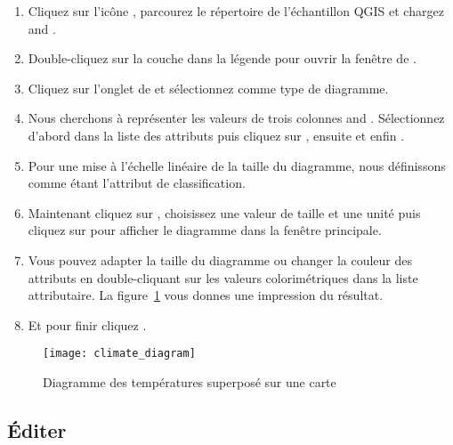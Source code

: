 \begin{itemize}
\begin{enumerate}
\item Cliquez sur l'icône , parcourez le répertoire de l'échantillon QGIS et chargez  and .
\item Double-cliquez sur la couche  dans la légende pour ouvrir la fenêtre de .
\item Cliquez sur l'onglet de  et sélectionnez  comme type de diagramme.
\item Nous cherchons à représenter les valeurs de trois colonnes  and . Sélectionnez d'abord  dans la liste des attributs puis cliquez sur , ensuite  et enfin .  
\item Pour une mise à l'échelle linéaire de la taille du diagramme, nous définissons  comme étant l'attribut de classification.
\item Maintenant cliquez sur , choisissez une valeur de taille et une unité puis cliquez sur  pour afficher le diagramme dans la fenêtre principale.
\item Vous pouvez adapter la taille du diagramme ou changer la couleur des attributs en double-cliquant sur les valeurs colorimétriques dans la liste attributaire. La figure~\ref{fig:climatediagram} vous donnes une impression du résultat.
\item Et pour finir cliquez . 
\end{enumerate}

\begin{figure}[ht]
   \begin{center}
   \caption{Diagramme des températures superposé sur une carte \nixcaption}\label{fig:climatediagram}\smallskip
   \texttt{[image: climate\_diagram]}
\end{center}
\end{figure}

\subsection{Éditer}


\end{itemize}
